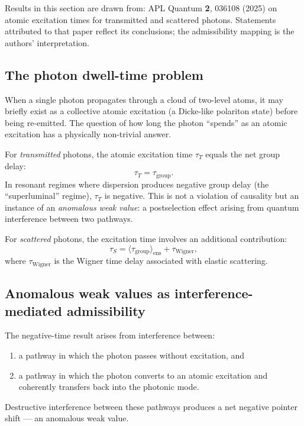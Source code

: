 \documentclass[12pt, a4paper]{article}
\theoremstyle{plain}
\theoremstyle{definition}
\theoremstyle{remark}
\begin{document}
\begin{established}
  Results in this section are drawn from:
  APL Quantum \textbf{2}, 036108 (2025) on atomic excitation times
  for transmitted and scattered photons.
  Statements attributed to that paper reflect its conclusions;
  the admissibility mapping is the authors' interpretation.
\end{established}

\subsection{The photon dwell-time problem}

When a single photon propagates through a cloud of two-level atoms,
it may briefly exist as a collective atomic excitation
(a Dicke-like polariton state) before being re-emitted.
The question of how long the photon ``spends'' as an atomic excitation
has a physically non-trivial answer.

For \emph{transmitted} photons, the atomic excitation time
$\tau_T$ equals the net group delay:
\[
  \tau_T = \tau_{\mathrm{group}}.
\]
In resonant regimes where dispersion produces negative group delay
(the ``superluminal'' regime), $\tau_T$ is negative.
This is not a violation of causality but an instance of an
\emph{anomalous weak value}: a postselection effect arising from
quantum interference between two pathways.

For \emph{scattered} photons, the excitation time involves an
additional contribution:
\[
  \tau_S = \langle \tau_{\mathrm{group}} \rangle_{\mathrm{ens}}
           + \tau_{\mathrm{Wigner}},
\]
where $\tau_{\mathrm{Wigner}}$ is the Wigner time delay associated
with elastic scattering.

\subsection{Anomalous weak values as interference-mediated admissibility}

The negative-time result arises from interference between:
\begin{enumerate}
  \item a pathway in which the photon passes without excitation, and
  \item a pathway in which the photon converts to an atomic excitation
        and coherently transfers back into the photonic mode.
\end{enumerate}
Destructive interference between these pathways produces a net
negative pointer shift — an anomalous weak value.
\end{document}
